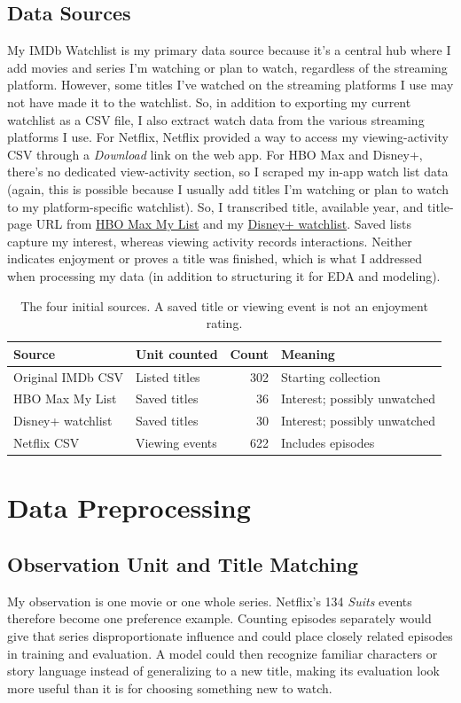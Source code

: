 \documentclass[11pt,letterpaper]{article}
\begin{document}
\subsection{Data Sources}
My IMDb Watchlist is my primary data source because it’s a central hub where I add movies and series I'm watching or plan to watch, regardless of the streaming platform. However, some titles I've watched on the streaming platforms I use may not have made it to the watchlist. So, in addition to exporting my current watchlist as a CSV file, I also extract watch data from the various streaming platforms I use. For Netflix, Netflix provided a way to access my viewing-activity CSV through a \emph{Download} link on the web app\cite{netflix}. For HBO Max and Disney+, there's no dedicated view-activity section, so I scraped my in-app watch list data (again, this is possible because I usually add titles I'm watching or plan to watch to my platform-specific watchlist). So, I transcribed title, available year, and title-page URL from \href{https://play.hbomax.com/my-stuff}{HBO Max My List} and my \href{https://www.disneyplus.com/browse/watchlist}{Disney+ watchlist}. Saved lists capture my interest, whereas viewing activity records interactions. Neither indicates enjoyment or proves a title was finished, which is what I addressed when processing my data (in addition to structuring it for EDA and modeling).


\begin{table}[htbp]\centering\small
\begin{tabular}{@{}p{.27\linewidth}p{.20\linewidth}rp{.32\linewidth}@{}}\toprule
Source &Unit counted &Count &Meaning\\\midrule
Original IMDb CSV&Listed titles&302&Starting collection\\
HBO Max My List&Saved titles&36&Interest; possibly unwatched\\
Disney+ watchlist&Saved titles&30&Interest; possibly unwatched\\
Netflix CSV&Viewing events&622&Includes episodes\\
\bottomrule\end{tabular}
\caption{The four initial sources. A saved title or viewing event is not an enjoyment rating.}\label{tab:sources}\end{table}


\FloatBarrier
\section{Data Preprocessing}
\subsection{Observation Unit and Title Matching}
My observation is one movie or one whole series. Netflix's 134 \emph{Suits} events therefore become one preference example. Counting episodes separately would give that series disproportionate influence and could place closely related episodes in training and evaluation. A model could then recognize familiar characters or story language instead of generalizing to a new title, making its evaluation look more useful than it is for choosing something new to watch.
\end{document}
